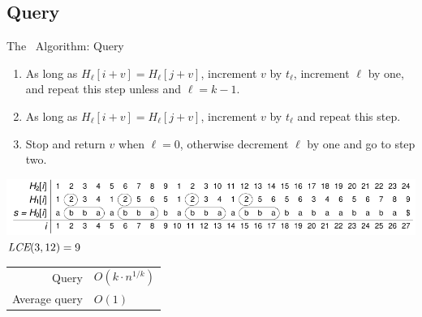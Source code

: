 \documentclass{beamer}
\begin{document}
\subsection{Query}
\begin{frame}{The \fprintk\ Algorithm: Query}
    \begin{enumerate}
        \item As long as $H_\ell[i+v] = H_\ell[j+v]$, increment $v$ by $t_\ell$, increment $\ell$ by one, and repeat this step unless and $\ell = k-1$.
        \item As long as $H_\ell[i+v] = H_\ell[j+v]$, increment $v$ by $t_\ell$ and repeat this step.
        \item Stop and return $v$ when $\ell = 0$, otherwise decrement $\ell$ by one and go to step two.
    \end{enumerate}
    \begin{center}
        \includegraphics[width=1\textwidth,page=2]{../doc/fingerprint.pdf}\\
         $\textit{LCE}(3,12)=9$
    \end{center}
    \begin{tabular}{r l}
        Query & $O(k\cdot n^{1/k})$ \\
        Average query & $O(1)$ \\
    \end{tabular}
\end{frame}

\end{document}
